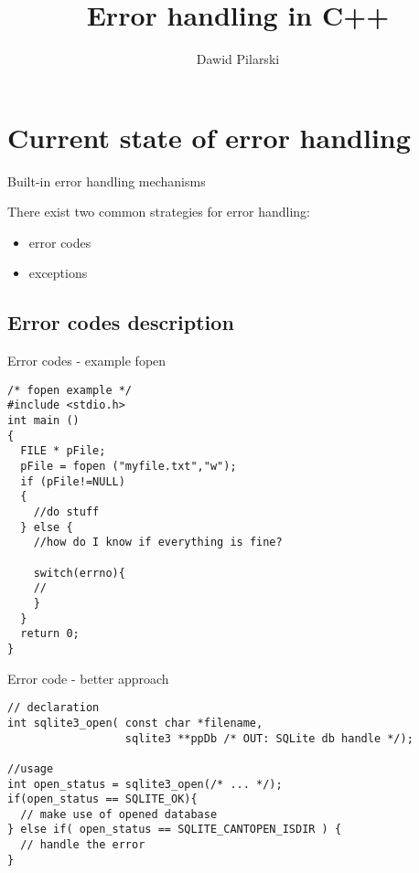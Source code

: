\documentclass[10pt,a4paper]{beamer}
\date{}
\author{Dawid Pilarski}
\title{Error handling in C++}
\begin{document}
\begin{frame}
	\titlepage
\end{frame}

\begin{frame}
	\tableofcontents
\end{frame}

\section{Current state of error handling}
\begin{frame}{Built-in error handling mechanisms}
	
	There exist two common strategies for error handling:
	\begin{itemize}
		\item error codes
		\item exceptions
	\end{itemize}

\end{frame}

\subsection{Error codes description}
\begin{frame}[fragile]{Error codes - example fopen}
	\begin{verbatim}
/* fopen example */
#include <stdio.h>
int main ()
{
  FILE * pFile;
  pFile = fopen ("myfile.txt","w");
  if (pFile!=NULL)
  {
    //do stuff
  } else {
    //how do I know if everything is fine?
    
    switch(errno){
    // 
    }
  }
  return 0;
}
	\end{verbatim}
\end{frame}


\begin{frame}[fragile]{Error code - better approach}
	\begin{verbatim}
// declaration
int sqlite3_open( const char *filename,
                  sqlite3 **ppDb /* OUT: SQLite db handle */);
	
//usage
int open_status = sqlite3_open(/* ... */);
if(open_status == SQLITE_OK){
  // make use of opened database
} else if( open_status == SQLITE_CANTOPEN_ISDIR ) {
  // handle the error
}
	\end{verbatim}
\end{frame}
\end{document}
